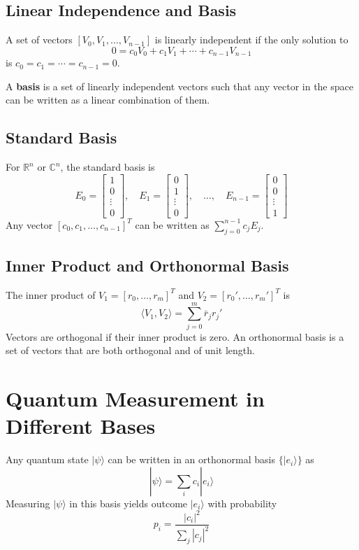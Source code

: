 \documentclass{book}
\begin{document}
\subsection{Linear Independence and Basis}
A set of vectors $[V_0, V_1, \ldots, V_{n-1}]$ is linearly independent if the only solution to
\[
0 = c_0 V_0 + c_1 V_1 + \cdots + c_{n-1} V_{n-1}
\]
is $c_0 = c_1 = \cdots = c_{n-1} = 0$.

A \textbf{basis} is a set of linearly independent vectors such that any vector in the space can be written as a linear combination of them.

\subsection{Standard Basis}
For $\mathbb{R}^n$ or $\mathbb{C}^n$, the standard basis is
\[
E_0 = 
\begin{bmatrix}
1 \\ 0 \\ \vdots \\ 0
\end{bmatrix},\quad
E_1 = 
\begin{bmatrix}
0 \\ 1 \\ \vdots \\ 0
\end{bmatrix},\quad
\ldots,\quad
E_{n-1} = 
\begin{bmatrix}
0 \\ 0 \\ \vdots \\ 1
\end{bmatrix}
\]
Any vector $[c_0, c_1, \ldots, c_{n-1}]^T$ can be written as $\sum_{j=0}^{n-1} c_j E_j$.

\subsection{Inner Product and Orthonormal Basis}
The inner product of $V_1 = [r_0, \ldots, r_m]^T$ and $V_2 = [r_0', \ldots, r_m']^T$ is
\[
\langle V_1, V_2 \rangle = \sum_{j=0}^m \bar{r}_j r_j'
\]
Vectors are orthogonal if their inner product is zero. An orthonormal basis is a set of vectors that are both orthogonal and of unit length.

\section{Quantum Measurement in Different Bases}
Any quantum state $|\psi\rangle$ can be written in an orthonormal basis $\{|e_i\rangle\}$ as
\[
|\psi\rangle = \sum_{i} c_i |e_i\rangle
\]
Measuring $|\psi\rangle$ in this basis yields outcome $|e_i\rangle$ with probability
\[
p_i = \frac{|c_i|^2}{\sum_j |c_j|^2}
\]
\end{document}
